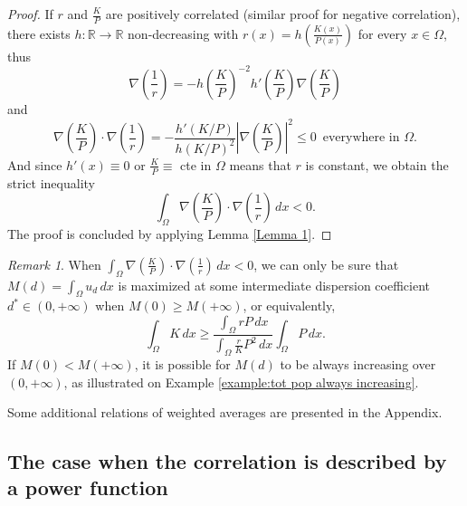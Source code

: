 \documentclass[11pt]{article}
\newcommand{\R}{\mathbb{R}}
\newcommand{\parentheses}[1]{\left(#1\right)}
\newcommand{\module}[1]{\left|#1\right|}
\theoremstyle{definition}
\theoremstyle{remark}
\newtheorem{remark}[statement]{Remark}
\begin{document}
\begin{proof}
If $r$ and $\frac{K}{P}$ are positively correlated (similar proof for negative correlation),  there exists $h:\R\to\R$ non-decreasing with $r(x)=h\parentheses{\frac{K(x)}{P(x)}}$ for every $x\in\Omega$, thus
    \begin{equation*}
        \nabla \parentheses{\frac{1}{r}}=-h\parentheses{\frac{K}{P}}^{-2}h'\parentheses{\frac{K}{P}}\nabla\parentheses{\frac{K}{P}}
    \end{equation*}
    and
    \begin{equation*}
        \nabla\parentheses{\frac{K}{P}}\cdot\nabla \parentheses{\frac{1}{r}}=-\frac{h'\parentheses{K/P}}{h\parentheses{K/P}^2}\module{\nabla\parentheses{\frac{K}{P}}}^2\leq0\,\textrm{ everywhere in }\Omega.
    \end{equation*}
    And since $h'(x)\equiv0$ or $\frac{K}{P}\equiv$ cte in $\Omega$ means that $r$ is constant, we obtain the strict inequality 
   \begin{equation*}
   \int_\Omega\nabla\parentheses{\frac{K}{P}}\cdot\nabla \parentheses{\frac{1}{r}}\,dx<0.
   \end{equation*}   
   The proof is concluded by applying Lemma \ref{Lemma 1}.
\end{proof}


\begin{remark}\label{rmk: tot pop maximized}
    When $\displaystyle\int_\Omega\nabla\parentheses{\frac{K}{P}}\cdot\nabla \parentheses{\frac{1}{r}}\,dx<0$, we can only be sure that $M(d)=\displaystyle\int_\Omega u_d\,dx$ is maximized at some intermediate dispersion coefficient $d^*\in(0,+\infty)$ when $M(0)\geq M(+\infty)$, or equivalently,
    \begin{equation*}
        \int_\Omega K\,dx\geq\frac{\int_\Omega rP\,dx}{\int_\Omega\frac{r}{K}P^2\,dx}\int_\Omega P\,dx.
    \end{equation*}
    If $M(0)<M(+\infty)$, it is possible for $M(d)$ to be always increasing over $(0,+\infty)$, as illustrated on Example \ref{example:tot pop always increasing}.  
\end{remark}


Some additional relations of weighted averages are presented in the Appendix.




\subsection{The case when the correlation is described by a power  function}
\end{document}
